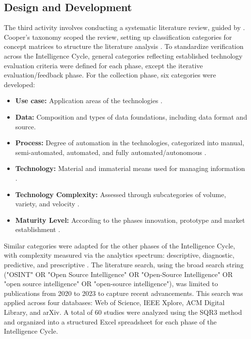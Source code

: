\documentclass[10pt]{article}
\begin{document}
\subsection{Design and Development}
The third activity involves conducting a systematic literature review, guided by \cite{Cleven.2009}. Cooper's taxonomy \cite{Cooper.1988} scoped the review, setting up classification categories for concept matrices to structure the literature analysis \cite{Webster.2002}.
To standardize verification across the Intelligence Cycle, general categories reflecting established technology evaluation criteria were defined for each phase, except the iterative evaluation/feedback phase. For the collection phase, six categories were developed:
\begin{itemize}
    \item \textbf{Use case:} Application areas of the technologies .
    \item \textbf{Data:} Composition and types of data foundations, including data format and source.
    \item \textbf{Process:} Degree of automation in the technologies, categorized into manual, semi-automated, automated, and fully automated/autonomous \cite{Duncheon.2002, Billings.1997, Endsley.1999}.
    \item \textbf{Technology:} Material and immaterial means used for managing information \cite{Bleck.2004}.
    \item \textbf{Technology Complexity:} Assessed through subcategories of volume, variety, and velocity \cite{Elgendy.2014, Singh.2012}.
    \item \textbf{Maturity Level:} According to the phases innovation, prototype and  market establishment \cite{Stich.2022}.
\end{itemize}

Similar categories were adapted for the other phases of the Intelligence Cycle, with complexity measured via the analytics spectrum: descriptive, diagnostic, predictive, and prescriptive \cite{Delen.2013}.
The literature search, using the broad search string ("OSINT" OR "Open Source Intelligence" OR "Open-Source Intelligence" OR "open source intelligence" OR "open-source intelligence"), was limited to publications from 2020 to 2023 to capture recent advancements. This search was applied across four databases: Web of Science, IEEE Xplore, ACM Digital Library, and arXiv. A total of 60 studies were analyzed using the SQR3 method \cite{Robinson.1970} and organized into a structured Excel spreadsheet for each phase of the Intelligence Cycle.
\end{document}
